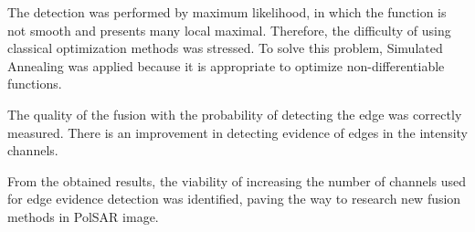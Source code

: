 \documentclass[a4paper,12pt]{article}
\begin{document}
The detection was performed by maximum likelihood, in which the function is not smooth and presents many local maximal.
Therefore, the difficulty of using classical optimization methods was stressed. 
To solve this problem, Simulated Annealing was applied because it is appropriate to optimize non-differentiable functions.

The quality of the fusion with the probability of detecting the edge was correctly measured. There is an improvement in detecting evidence of edges in the intensity channels.

From the obtained results, the viability of increasing the number of channels used for edge evidence detection was identified, paving the way to research new fusion methods in PolSAR image.

	
	
\end{document}
